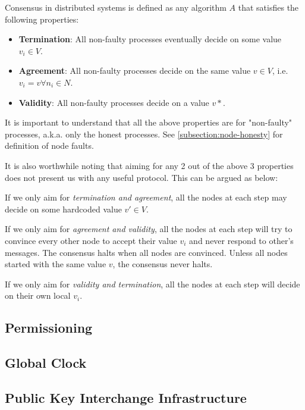 Consensus in distributed systems is defined as any algorithm $A$ that satisfies the following properties:
\begin{itemize}
    \item \textbf{Termination}: All non-faulty processes eventually decide on some value $v_i \in V$.
    \item \textbf{Agreement}: All non-faulty processes decide on the same value $v \in V$, i.e. $v_i = v \forall n_i \in N$.
    \item \textbf{Validity}: All non-faulty processes decide on a value $v*$.
\end{itemize}

It is important to understand that all the above properties are for "non-faulty" processes, a.k.a. only the honest processes. See \ref{subsection:node-honesty} for definition of node faults.

It is also worthwhile noting that aiming for any 2 out of the above 3 properties does not present us with any useful protocol. This can be argued as below:

If we only aim for \emph{termination and agreement}, all the nodes at each step may decide on some hardcoded value $v' \in V$.

If we only aim for \emph{agreement and validity}, all the nodes at each step will try to convince every other node to accept their value $v_i$ and never respond to other's messages. The consensus halts when all nodes are convinced. Unless all nodes started with the same value $v$, the consensus never halts.

If we only aim for \emph{validity and termination}, all the nodes at each step will decide on their own local $v_i$.

\subsection{Permissioning}

\subsection{Global Clock}

\subsection{Public Key Interchange Infrastructure}